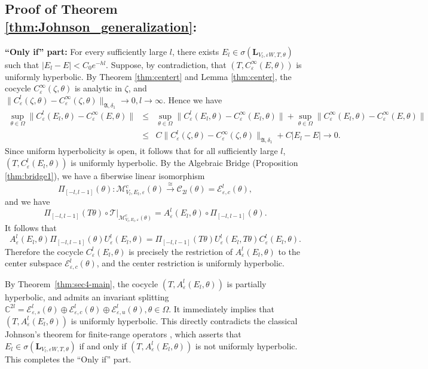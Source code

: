 \documentclass[reqno,11pt]{amsart}
\begin{document}
\subsection*{Proof of Theorem \ref{thm:Johnson_generalization}:} 
\textbf{``Only if'' part:}
For every sufficiently large $l$, there exists
$
 E_l\in \sigma(\mathbf{L}_{V_l,\varepsilon W,T,\theta})
$
such that
$
| E_l-E|<C_0e^{-h l}.
$
Suppose, by contradiction, that
$(T, C^\infty_\varepsilon(E,\theta))
$
is uniformly hyperbolic.
By Theorem \ref{thm:centert} and Lemma \ref{thm:center}, the cocycle $C^\infty_\varepsilon(\zeta,\theta)$ is analytic in $\zeta$,
and
$
\|C^l_\varepsilon(\zeta,\theta)-C^\infty_\varepsilon(\zeta,\theta)\|_{\mathfrak A,\delta_1}
\to 0 ,l\to\infty.
$
Hence we have
\begin{eqnarray*}
\sup_{\theta\in\Omega}\|C^l_\varepsilon( E_l,\theta)-C^\infty_\varepsilon(E,\theta)\|
&\leq&
\sup_{\theta\in\Omega}\|C^l_\varepsilon( E_l,\theta)-C^\infty_\varepsilon( E_l,\theta)\| +\sup_{\theta\in\Omega}
\|C^\infty_\varepsilon( E_l,\theta)-C^\infty_\varepsilon(E,\theta)\| \\
&\leq&
C\|C^l_\varepsilon(\zeta,\theta)-C^\infty_\varepsilon(\zeta,\theta)\|_{\mathfrak A,\delta_1}
+C| E_l-E|\to 0.
\end{eqnarray*}
Since uniform hyperbolicity is open, it follows that for all sufficiently large $l$,
$(T, C^l_\varepsilon( E_l,\theta))
$
is uniformly hyperbolic.
By the Algebraic Bridge (Proposition \ref{thm:bridge1}), we have a fiberwise linear isomorphism
$$
 \Pi_{[-l,l-1]}(\theta):\mathcal M^c_{V_l,E_l,\varepsilon}(\theta) \xrightarrow{\cong} \mathcal{C}_{2l}(\theta) =\mathcal E^l_{\varepsilon,c}(\theta)
,
$$
and we have
    $$
    \Pi_{[-l,l-1]}(T\theta)\circ \mathscr T\big|_{\mathcal M_{V_l,E_l,\varepsilon}^c(\theta)}
    =  A_{\varepsilon}^{l}(E_l,\theta) \circ \Pi_{[-l,l-1]}(\theta).
    $$ 
It follows that $$ A_{\varepsilon}^{l}(E_l,\theta)\Pi_{[-l,l-1]}(\theta)U_\varepsilon^l(E_l,\theta)=\Pi_{[-l,l-1]}(T\theta)U_\varepsilon^l(E_l,T\theta)C^l_\varepsilon(E_l,\theta).$$
Therefore the cocycle $C^l_\varepsilon( E_l,\theta)$ is precisely the restriction of
$A^l_\varepsilon( E_l,\theta)$ to the center subspace
$\mathcal E^l_{\varepsilon,c}(\theta)$, and the center restriction
is uniformly hyperbolic.



By Theorem~\ref{thm:sec4-main}, the  cocycle
$(T,A^l_\varepsilon( E_l,\theta))$ is partially hyperbolic, and  admits an invariant splitting
$
\mathbb C^{2l}=\mathcal E^l_{\varepsilon,s}(\theta)\oplus\mathcal E^l_{\varepsilon,c}(\theta)
\oplus\mathcal E^l_{\varepsilon,u}(\theta),
 \theta\in\Omega.
$
 It immediately implies that $(T,A^l_\varepsilon( E_l,\theta))$ is uniformly hyperbolic. This directly contradicts the classical Johnson's theorem for finite-range operators \cite{HaroPuig}, which asserts that $E_l \in \sigma(\mathbf{L}_{V_l,\varepsilon W,T,\theta})$ if and only if $(T, A_{\varepsilon}^{l}(E_l,\theta))$ is not uniformly hyperbolic. This completes the ``Only if'' part.
\end{document}

